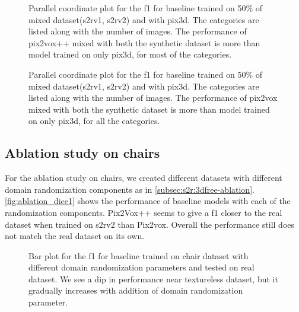 \begin{figure}
    \centering
    \resizebox{0.75\textwidth}{!}{}
    \caption{Parallel coordinate plot for the \gls{f1} for baseline  trained on 50\% of mixed dataset(\gls{s2rv1}, \gls{s2rv2}) and with pix3d.
    The categories are listed along with the number of images.
    The performance of pix2vox++ mixed with both the synthetic dataset is more than model trained on only pix3d, for most of the categories.
    }
    \label{fig:mixed_dice2}
\end{figure}

\begin{figure}
    \centering
    \resizebox{0.7\textwidth}{!}{}
    \caption{Parallel coordinate plot for the \gls{f1} for baseline  trained on 50\% of mixed dataset(\gls{s2rv1}, \gls{s2rv2}) and with pix3d.
    The categories are listed along with the number of images.
    The performance of pix2vox mixed with both the synthetic dataset is more than model trained on only pix3d, for all the categories.}
    \label{fig:mixed_dice3}
\end{figure}

\subsection{Ablation study on chairs}\label{subsec:ablation-study-on-chairs}

For the ablation study on chairs, we created different datasets with different domain randomization components as in \autoref{subsec:s2r:3dfree-ablation}.
\autoref{fig:ablation_dice1} shows the performance of baseline models with each of the randomization components.
Pix2Vox++ seems to give a \gls{f1} closer to the real dataset when trained on \gls{s2rv2} than Pix2vox.
Overall the performance still does not match the real dataset on its own.

\begin{figure}[ht]
    \centering
    \resizebox{0.7\textwidth}{!}{}
    \caption{Bar plot for the \gls{f1}  for baseline trained on chair dataset with different domain randomization parameters and tested on real dataset.
    We see a dip in performance near textureless dataset, but it gradually increases with addition of domain randomization parameter.}
    \label{fig:ablation_dice1}
\end{figure}

